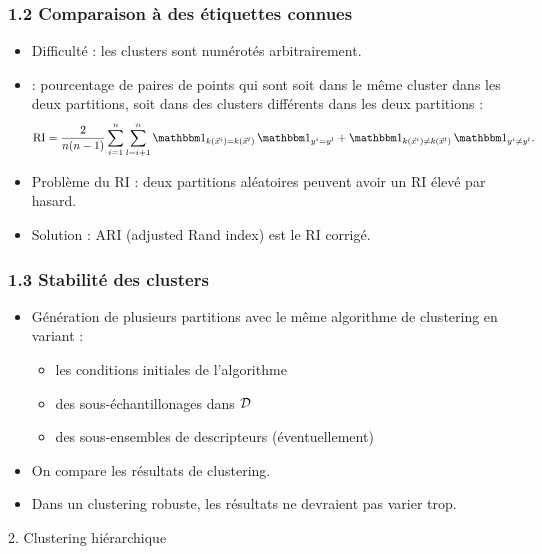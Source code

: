 \begin{frame}
  \frametitle{1.2 Comparaison à des étiquettes connues}
  \begin{itemize}
  \item Difficulté : les clusters sont numérotés arbitrairement. 
  \pause
  \item {} : pourcentage de paires de points qui sont soit dans le même cluster dans les deux partitions, soit dans des clusters différents dans les deux partitions : 
    \begin{equation*}
      \text{RI} = \frac2{n (n-1)} \sum_{i=1}^n \sum_{l=i+1}^n 
      \indic_{k(\xvec^i) = k(\xvec^l)} \, \indic_{y^i = y^l} + 
      \indic_{k(\xvec^i) \neq k(\xvec^l)} \, \indic_{y^i \neq y^l}.
    \end{equation*}

  \item Problème du RI : deux partitions aléatoires peuvent avoir un RI élevé par hasard. 
  \item Solution : ARI (adjusted Rand index) est le RI corrigé. 

  \end{itemize}
\end{frame}

\begin{frame}
  \frametitle{1.3 Stabilité des clusters}
  \begin{itemize}
    \item Génération de plusieurs partitions avec le même algorithme de clustering en variant : 
    \begin{itemize}
      \item les conditions initiales de l'algorithme
      \item des sous-échantillonages dans $\mathcal{D}$
      \item des sous-ensembles de descripteurs (éventuellement)
    \end{itemize}
    \item On compare les résultats de clustering.
    \item Dans un clustering robuste, les résultats ne devraient pas varier trop. 
  \end{itemize}
\end{frame}


\begin{frame}
  \begin{center}
    \large{2. Clustering hiérarchique}
  \end{center}
\end{frame}

